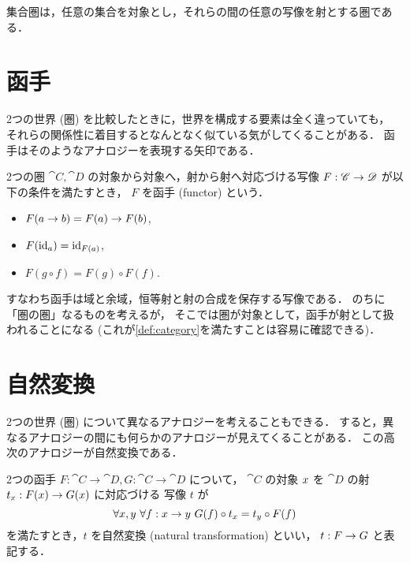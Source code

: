 \documentclass[titlepage]{ltjsreport}
\begin{document}
\begin{definition}[集合圏]
  集合圏は，任意の集合を対象とし，それらの間の任意の写像を射とする圏である．
\end{definition}

\section{函手}

2つの世界 (圏) を比較したときに，世界を構成する要素は全く違っていても，
それらの関係性に着目するとなんとなく似ている気がしてくることがある．
函手はそのようなアナロジーを表現する矢印である．
\begin{definition}[函手]
  \def\a{\obj{a}}%
  \def\b{\obj{b}}%
  2つの圏 $\cat{C},\cat{D}$ の対象から対象へ，射から射へ対応づける写像
  ${F}:{\mathscr{C}}\to{\mathscr{D}}$ が以下の条件を満たすとき，
  $F$ を函手 (functor) という．
  \begin{itemize}
    \item $F(\a\to\b)=F(\a)\to F(\b)$,
    \item $F(\id{\a})=\id{F(\a)}$,
    \item $F(g\circ f)=F(g)\circ F(f)$.
  \end{itemize}
  \begin{center}
    
  \end{center}
\end{definition}
すなわち函手は域と余域，恒等射と射の合成を保存する写像である．
のちに「圏の圏」なるものを考えるが，
そこでは圏が対象として，函手が射として扱われることになる
(これが\cref{def:category}を満たすことは容易に確認できる)．

\section{自然変換}

2つの世界 (圏) について異なるアナロジーを考えることもできる．
すると，異なるアナロジーの間にも何らかのアナロジーが見えてくることがある．
この高次のアナロジーが自然変換である．

\begin{definition}[自然変換]
  \def\x{\obj{x}}%
  \def\y{\obj{y}}%
  2つの函手 $F:\cat{C}\to\cat{D},G:\cat{C}\to\cat{D}$ について，
  $\cat{C}$ の対象 $\x$ を $\cat{D}$ の射 $t_{\x}:F(\x)\to G(\x)$ に対応づける
  写像 $t$ が
  \begin{equation}
    \forall\x,\y\ \forall\mrp{f}{\x}{\y}\ G(f)\circ t_{\x}=t_{\y}\circ F(f)
  \end{equation}
  を満たすとき，$t$ を自然変換 (natural transformation) といい，
  ${t}:{F}\to{G}$ と表記する．
  \begin{center}
    
  \end{center}
\end{definition}
\end{document}
